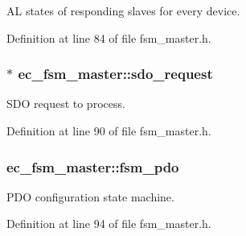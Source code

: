 A\-L states of responding slaves for every device. 



Definition at line 84 of file fsm\-\_\-master.\-h.

\subsubsection[{sdo\-\_\-request}]{$\ast$ ec\-\_\-fsm\-\_\-master\-::sdo\-\_\-request}\label{structec__fsm__master_a4d4e15f7b94cd12a63a7450db070840b}


S\-D\-O request to process. 



Definition at line 90 of file fsm\-\_\-master.\-h.

\subsubsection[{fsm\-\_\-pdo}]{ ec\-\_\-fsm\-\_\-master\-::fsm\-\_\-pdo}\label{structec__fsm__master_a93359faa0215a9448d5663a09f319372}


P\-D\-O configuration state machine. 



Definition at line 94 of file fsm\-\_\-master.\-h.

